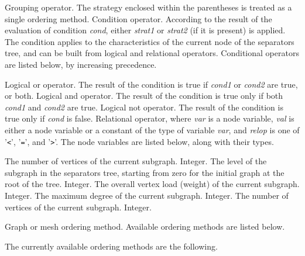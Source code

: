 \begin{itemize}
\iteme[{\tt (}{\it strat\/}{\tt )}]
Grouping operator.
The strategy enclosed within the parentheses is treated as a single
ordering method.
Condition operator. According to the result of the evaluation of
condition {\it cond}, either {\it strat1\/} or {\it strat2\/} (if it
is present) is applied. The condition applies to the characteristics
of the current node of the separators tree, and can be built from
logical and relational operators. Conditional operators are listed
below, by increasing precedence.
\begin{itemize}
Logical or operator. The result of the condition is true if {\it cond1\/}
or {\it cond2\/} are true, or both.
Logical and operator. The result of the condition is true only if both
{\it cond1\/} and {\it cond2\/} are true.
\iteme[{\tt !}{\it cond}]
Logical not operator. The result of the condition is true only if
{\it cond\/} is false.
Relational operator, where {\it var\/} is a node variable, {\it val\/} is
either a node variable or a constant of the type of variable {\it var}, and
{\it relop\/} is one of '{\tt\verb+<+}', '{\tt\verb+=+}', and '{\tt\verb+>+}'.
The node variables are listed below, along with their types.
\begin{itemize}
\iteme[{\tt edge}]
The number of vertices of the current subgraph.
Integer.
\iteme[{\tt levl}]
The level of the subgraph in the separators tree, starting from zero
for the initial graph at the root of the tree.
Integer.
\iteme[{\tt load}]
The overall vertex load (weight) of the current subgraph.
Integer.
\iteme[{\tt mdeg}]
The maximum degree of the current subgraph.
Integer.
\iteme[{\tt vert}]
The number of vertices of the current subgraph.
Integer.
\end{itemize}
\end{itemize}
\iteme[{\it method\/}{[{\tt \{}{\it parameters\/}{\tt \}}]}]
Graph or mesh ordering method. Available ordering methods are listed
below.
\end{itemize}
The currently available ordering methods are the following.
